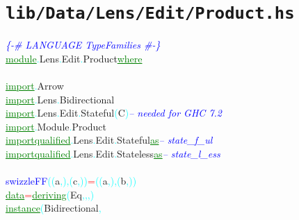 \section{\texttt{lib/Data/Lens/Edit/Product.hs}}
\label{mod:Data.Lens.Edit.Product}
\textcolor{blue}{{\it{}\{-\# LANGUAGE TypeFamilies \#-\}}}\\\textcolor{green}{\underline{module}}\textcolor{cyan}{.}{\rm{}Lens}\textcolor{cyan}{.}{\rm{}Edit}\textcolor{cyan}{.}{\rm{}Product}\hsspace \textcolor{green}{\underline{where}}\\\\\textcolor{green}{\underline{import}}\textcolor{cyan}{.}{\rm{}Arrow}\\\textcolor{green}{\underline{import}}\textcolor{cyan}{.}{\rm{}Lens}\textcolor{cyan}{.}{\rm{}Bidirectional}\\\textcolor{green}{\underline{import}}\textcolor{cyan}{.}{\rm{}Lens}\textcolor{cyan}{.}{\rm{}Edit}\textcolor{cyan}{.}{\rm{}Stateful}\hsspace \textcolor{cyan}{(}{\rm{}C}\textcolor{cyan}{)}\hsspace \textcolor{blue}{{\it{}-- needed for GHC 7.2}}\\\textcolor{green}{\underline{import}}\textcolor{cyan}{.}{\rm{}Module}\textcolor{cyan}{.}{\rm{}Product}\\\textcolor{green}{\underline{import}}\hsspace \textcolor{green}{\underline{qualified}}\textcolor{cyan}{.}{\rm{}Lens}\textcolor{cyan}{.}{\rm{}Edit}\textcolor{cyan}{.}{\rm{}Stateful}\hsspace \hsspace \textcolor{green}{\underline{as}}\hsspace \textcolor{blue}{{\it{}-- state\_f\_ul}}\\\textcolor{green}{\underline{import}}\hsspace \textcolor{green}{\underline{qualified}}\textcolor{cyan}{.}{\rm{}Lens}\textcolor{cyan}{.}{\rm{}Edit}\textcolor{cyan}{.}{\rm{}Stateless}\hsspace \textcolor{green}{\underline{as}}\hsspace \textcolor{blue}{{\it{}-- state\_l\_ess}}\\\\\textcolor{blue}{swizzleFF}\hsspace \textcolor{cyan}{(}\textcolor{cyan}{(}{\rm{}a}\textcolor{cyan}{,}\textcolor{cyan}{)}\textcolor{cyan}{,}\hsspace \textcolor{cyan}{(}{\rm{}c}\textcolor{cyan}{,}\textcolor{cyan}{)}\textcolor{cyan}{)}\hsspace \textcolor{red}{=}\hsspace \textcolor{cyan}{(}\textcolor{cyan}{(}{\rm{}a}\textcolor{cyan}{,}\textcolor{cyan}{)}\textcolor{cyan}{,}\hsspace \textcolor{cyan}{(}{\rm{}b}\textcolor{cyan}{,}\textcolor{cyan}{)}\textcolor{cyan}{)}\\\textcolor{green}{\underline{data}}\hsspace \textcolor{red}{=}\hsspace \textcolor{green}{\underline{deriving}}\hsspace \textcolor{cyan}{(}{\rm{}Eq}\textcolor{cyan}{,}\textcolor{cyan}{,}\textcolor{cyan}{,}\textcolor{cyan}{)}\\\textcolor{green}{\underline{instance}}\hsspace \textcolor{cyan}{(}{\rm{}Bidirectional}\textcolor{cyan}{,}\hsspace 